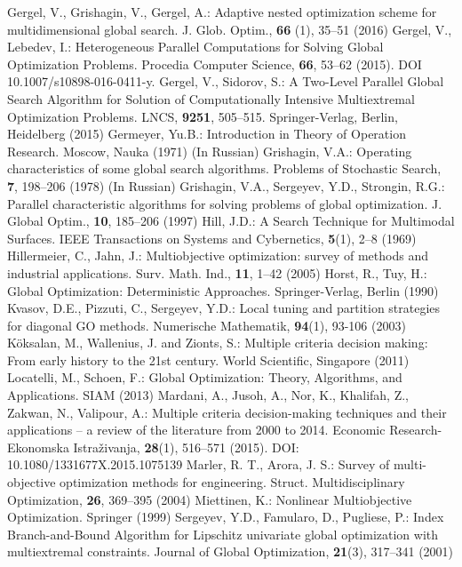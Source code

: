 \documentclass[smallcondensed]{svjour3}     %
\begin{document}
\begin{thebibliography}{}
	Gergel, V., Grishagin, V., Gergel, A.: Adaptive nested optimization scheme for multidimensional global search. J. Glob. Optim., \textbf{66} (1), 35--51 (2016) 
	Gergel, V., Lebedev, I.: Heterogeneous Parallel Computations for Solving Global Optimization Problems. Procedia Computer Science, \textbf{66}, 53--62 (2015). DOI 10.1007/s10898-016-0411-y.
	Gergel, V., Sidorov, S.: A Two-Level Parallel Global Search Algorithm for Solution of Computationally Intensive Multiextremal Optimization Problems. LNCS, \textbf{9251}, 505--515. Springer-Verlag, Berlin, Heidelberg (2015)
	Germeyer, Yu.B.: Introduction in Theory of Operation Research. Moscow, Nauka (1971) (In Russian)
	Grishagin, V.A.: Operating characteristics of some global search algorithms. Problems of Stochastic Search, \textbf{7}, 198--206 (1978) (In Russian)
	Grishagin, V.A., Sergeyev, Y.D., Strongin, R.G.: Parallel characteristic algorithms for solving problems of global optimization. J. Global Optim., \textbf{10}, 185--206 (1997)
	Hill, J.D.: A Search Technique for Multimodal Surfaces. IEEE Transactions on Systems and Cybernetics, \textbf{5}(1), 2--8 (1969)
	Hillermeier, C., Jahn, J.: Multiobjective optimization: survey of methods and industrial applications. Surv. Math. Ind., \textbf{11}, 1--42 (2005)
	Horst, R., Tuy, H.: Global Optimization: Deterministic Approaches. Springer-Verlag, Berlin (1990)
	Kvasov, D.E., Pizzuti, C., Sergeyev, Y.D.: Local tuning and partition strategies for diagonal GO methods. Numerische Mathematik, \textbf{94}(1), 93-106 (2003)
	K{\"o}ksalan, M., Wallenius, J. and Zionts, S.: Multiple criteria decision making: From early history to the 21st century. World Scientific, Singapore (2011)
	Locatelli, M., Schoen, F.: Global Optimization: Theory, Algorithms, and Applications. SIAM (2013)
	Mardani, A., Jusoh, A., Nor, K., Khalifah, Z., Zakwan, N., Valipour, A.: Multiple criteria decision-making techniques and their applications -- a review of the literature from 2000 to 2014. Economic Research-Ekonomska Istra\v{z}ivanja, \textbf{28}(1), 516--571 (2015). DOI: 10.1080/1331677X.2015.1075139
	Marler, R. T., Arora, J. S.: Survey of multi-objective optimization methods for engineering. Struct. Multidisciplinary Optimization, \textbf{26}, 369--395 (2004)
	Miettinen, K.: Nonlinear Multiobjective Optimization. Springer (1999)
	Sergeyev, Y.D., Famularo, D., Pugliese, P.: Index Branch-and-Bound Algorithm for Lipschitz univariate global optimization with multiextremal constraints. Journal of Global Optimization, \textbf{21}(3), 317--341 (2001)

\end{thebibliography}
\end{document}
